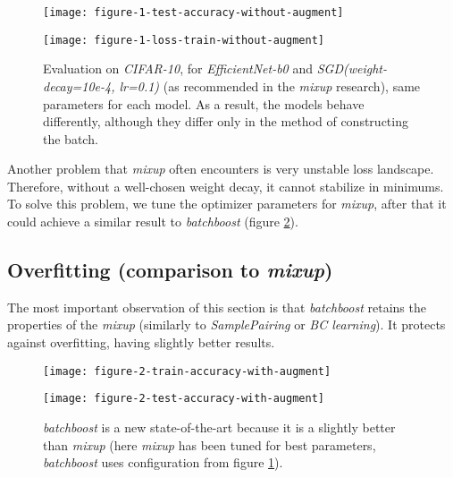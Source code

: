 \documentclass{article}
\begin{document}
\begin{figure}[H]
  \centering
\begin{minipage}{.3\textwidth}
  \hspace{-0.65cm}
  \texttt{[image: figure-1-test-accuracy-without-augment]}
\end{minipage}
\begin{minipage}{.65\textwidth}\vspace{-0.00cm}\hspace{0.865cm}
  \texttt{[image: figure-1-loss-train-without-augment]}
\end{minipage}\caption{Evaluation on \emph{CIFAR-10}, for \emph{EfficientNet-b0} and
	\emph{SGD(weight-decay=10e-4, lr=0.1)} (as
	recommended in the \emph{mixup} research), same parameters for each model.
	As a result, the models behave differently, although they differ only in the
	method of constructing the batch.}
\label{fig:under}
\end{figure}

Another problem that \emph{mixup} often encounters is very unstable loss
landscape. Therefore, without a well-chosen weight decay, it cannot stabilize in
minimums. To solve this problem, we tune the optimizer parameters
for \emph{mixup}, after that it could achieve a similar result to
\emph{batchboost} (figure \ref{fig:over}).

\subsection{Overfitting (comparison to \emph{mixup})}
\label{sec:over}

The most important observation of this section is that \emph{batchboost} retains
the properties of the \emph{mixup} (similarly to \emph{SamplePairing} or
\emph{BC learning}). It protects against overfitting, having slightly better results.

\begin{figure}[H]
  \centering
\begin{minipage}{.3\textwidth}
  \hspace{-0.65cm}
  \texttt{[image: figure-2-train-accuracy-with-augment]}
\end{minipage}
\begin{minipage}{.65\textwidth}\vspace{-0.00cm}\hspace{0.865cm}
	\texttt{[image: figure-2-test-accuracy-with-augment]}
\end{minipage}\caption{\emph{batchboost} is a new state-of-the-art because it is a slightly
	better than \emph{mixup} (here \emph{mixup} has been tuned for best
	parameters, \emph{batchboost} uses configuration from figure \ref{fig:under}).}
\label{fig:over}
\end{figure}
\end{document}
